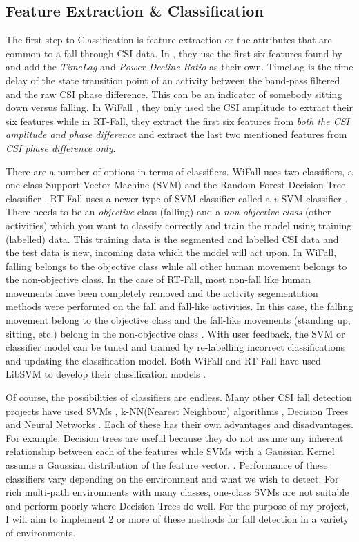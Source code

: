 \subsection{Feature Extraction \& Classification }
The first step to Classification is feature extraction or the attributes that are common to a fall through CSI data. In \cite{RTFall}, they use the first six features found by \cite{WiFall} and add the \textit{TimeLag} and \textit{Power Decline Ratio} as their own. TimeLag is the time delay of the state transition point of an activity between the band-pass filtered and the raw CSI phase difference. This can be an indicator of somebody sitting down versus falling. In WiFall \citep{WiFall}, they only used the CSI amplitude to extract their six features while in RT-Fall, they extract the first six features from \textit{both the CSI amplitude and phase difference} and extract the last two mentioned features from \textit{CSI phase difference only}. \par
There are a number of options in terms of classifiers. WiFall uses two classifiers, a one-class Support Vector Machine (SVM) and the Random Forest Decision Tree classifier \citep{WiFall}. RT-Fall uses a newer type of SVM classifier called a \textit{v}-SVM classifier \citep{newSVM}. There needs to be an \textit{objective} class (falling) and a \textit{non-objective class} (other activities) which you want to classify correctly and train the model using training (labelled) data. This training data is the segmented and labelled CSI data and the test data is new, incoming data which the model will act upon. In WiFall, falling belongs to the objective class while all other human movement belongs to the non-objective class. In the case of RT-Fall, most non-fall like human movements have been completely removed and the activity segementation methods were performed on the fall and fall-like activities. In this case, the falling movement belong to the objective class and the fall-like movements (standing up, sitting, etc.) belong in the non-objective class \citep{WiFall,RTFall}. With user feedback, the SVM or classifier model can be tuned and trained by re-labelling incorrect classifications and updating the classification model. Both WiFall and RT-Fall have used LibSVM to develop their classification models \citep{LibSVM}. \par
Of course, the possibilities of classifiers are endless. Many other CSI fall detection projects have used SVMs \citep{antiFall}, k-NN(Nearest Neighbour) algorithms \citep{robustdevicefree}, Decision Trees \citep{WiFall,Dayal2016HumanFD} and Neural Networks \citep{Dayal2016HumanFD}. Each of these has their own advantages and disadvantages. For example, Decision trees are useful because they do not assume any inherent relationship between each of the features while SVMs with a Gaussian Kernel assume a Gaussian distribution of the feature vector. \citep{Dayal2016HumanFD}. Performance of these classifiers vary depending on the environment and what we wish to detect. For rich multi-path environments with many classes, one-class SVMs are not suitable and perform poorly where Decision Trees do well. For the purpose of my project, I will aim to implement 2 or more of these methods for fall detection in a variety of environments. \par
